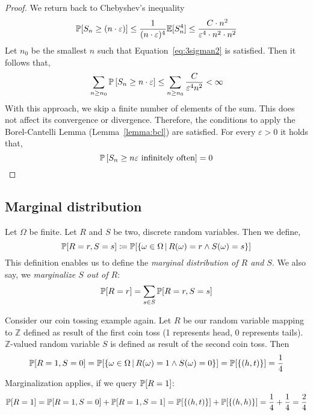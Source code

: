 \begin{proof}
  We return back to Chebyshev's inequality
  \[
      \mathbb P[S_n \geq (n\cdot\varepsilon)]
      \leq \frac{1}{(n\cdot\varepsilon)^4} \mathbb E[S_n^4]
      \leq \frac{C \cdot n^2}{\varepsilon^4 \cdot n^2 \cdot n^2}
  \]
  Let $n_0$ be the smallest $n$ such that Equation~\eqref{eq:3sigman2} is satisfied.
  Then it follows that,
  \[
      \sum_{n \geq n_0} \mathbb P\left[S_n \geq n \cdot \varepsilon\right]
      \leq \sum_{n \geq n_0} \frac{C}{\varepsilon^4 n^2} < \infty
  \]
  With this approach, we skip a finite number of elements of the sum. This does not affect its convergence or divergence.
  Therefore, the conditions to apply the Borel-Cantelli Lemma (Lemma~\ref{lemma:bcl}) are satisfied.
  For every $\varepsilon > 0$ it holds that,
  \[ \mathbb P\left[S_n \geq n \varepsilon \text{ infinitely often}\right] = 0 \]
\end{proof}

\subsection{Marginal distribution}
\label{sec:bp-marginalization}
%
\begin{definition}
  Let $\Omega$ be finite.
  Let $R$ and $S$ be two, discrete random variables. Then we define,
  \[
    \mathbb P[R=r, S=s] \coloneqq \mathbb P[\left\{\omega \in \Omega\,|\,R(\omega) = r \land S(\omega) = s\right\}]
  \]
  This definition enables us to define the \emph{marginal distribution of $R$ and $S$}.
  We also say, we \emph{marginalize $S$ out of $R$}:
  \[ \mathbb P[R=r] = \sum_{s \in S} \mathbb P[R=r, S=s] \]
\end{definition}
\begin{example}
  Consider our coin tossing example again.
  Let $R$ be our random variable mapping to $\mathbb Z$ defined as result of the first coin toss
  (1 represents head, 0 represents tails).
  $\mathbb Z$-valued random variable $S$ is defined as result of the second coin toss.
  Then
  \[
    \mathbb P[R=1, S=0] = \mathbb P[\left\{\omega \in \Omega\,|\,R(\omega) = 1 \land S(\omega) = 0\right\}]
                    = \mathbb P[\left\{(h, t)\right\}] = \frac14
  \]
  Marginalization applies, if we query $\mathbb P[R=1]$:
  \[
    \mathbb P[R=1] = \mathbb P[R=1, S=0] + \mathbb P[R=1, S=1] = \mathbb P[\left\{(h, t)\right\}] + \mathbb P[\left\{(h, h)\right\}] = \frac14 + \frac14 = \frac24
  \]
\end{example}

